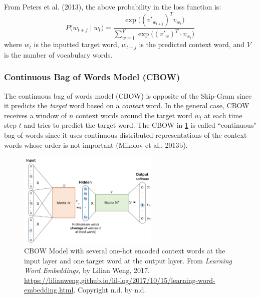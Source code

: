 From Peters et al. (2013), the above probability in the loss function is:
$$
P \Big( w_{t+j} \; | \; w_t \Big) = \frac {\exp{ \Big( (v'_{w_{t+j}})^T  v_{w_t} \Big) }} {\sum_{w=1}^V \exp{ \Big( (v'_w)^T \cdot v_{w_t} \Big) }}
$$
where $w_t$ is the inputted target word, $w_{t+j}$ is the predicted context word, and $V$ is the number of vocabulary words. 
 



\subsubsection{Continuous Bag of Words Model (CBOW)} \label{sec:CBOW}

The continuous bag of words model (CBOW) is opposite of the Skip-Gram since it predicts the \emph{target} word based on a \emph{context} word. In the general case, CBOW receives a window of $n$ context words around the target word $w_t$ at each time step $t$ and tries to predict the target word. The CBOW in \cref{fig:CBOW} is called ``continuous" bag-of-words since it uses continuous distributed representations of the context words whose order is not important (Mikolov et al., 2013b). 

\begin{figure}[h] 
\vspace{-5pt}
\centering
\includegraphics[width=0.6\textwidth]{imgs/cbow.png}
\vspace{-5pt}
\caption{\footnotesize CBOW Model with several one-hot encoded context words at the input layer and one target word at the output layer. From \emph{Learning Word Embeddings}, by Lilian Weng, 2017. \url{https://lilianweng.github.io/lil-log/2017/10/15/learning-word-embedding.html}. Copyright n.d. by n.d.}
\label{fig:CBOW}
\vspace{-5pt}
\end{figure}

